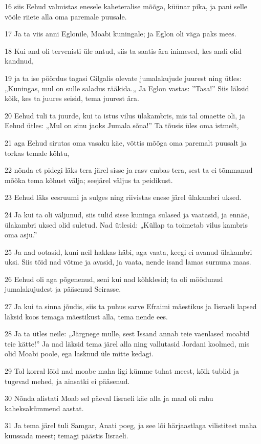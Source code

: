 \par 16 siis Eehud valmistas enesele kaheteralise mõõga, küünar pika, ja pani selle vööle riiete alla oma paremale puusale.
\par 17 Ja ta viis anni Eglonile, Moabi kuningale; ja Eglon oli väga paks mees.
\par 18 Kui and oli tervenisti üle antud, siis ta saatis ära inimesed, kes andi olid kandnud,
\par 19 ja ta ise pöördus tagasi Gilgalis olevate jumalakujude juurest ning ütles: „Kuningas, mul on sulle saladus rääkida.„ Ja Eglon vastas: ”Tasa!” Siis läksid kõik, kes ta juures seisid, tema juurest ära.
\par 20 Eehud tuli ta juurde, kui ta istus vilus ülakambris, mis tal omaette oli, ja Eehud ütles: „Mul on sinu jaoks Jumala sõna!” Ta tõusis üles oma istmelt,
\par 21 aga Eehud sirutas oma vasaku käe, võttis mõõga oma paremalt puusalt ja torkas temale kõhtu,
\par 22 nõnda et pidegi läks tera järel sisse ja rasv embas tera, sest ta ei tõmmanud mõõka tema kõhust välja; seejärel väljus ta peidikust.
\par 23 Eehud läks eesruumi ja sulges ning riivistas enese järel ülakambri uksed.
\par 24 Ja kui ta oli väljunud, siis tulid sisse kuninga sulased ja vaatasid, ja ennäe, ülakambri uksed olid suletud. Nad ütlesid: „Küllap ta toimetab vilus kambris oma asju.”
\par 25 Ja nad ootasid, kuni neil hakkas häbi, aga vaata, keegi ei avanud ülakambri uksi. Siis tõid nad võtme ja avasid, ja vaata, nende isand lamas surnuna maas.
\par 26 Eehud oli aga põgenenud, seni kui nad kõhklesid; ta oli möödunud jumalakujudest ja pääsenud Seirasse.
\par 27 Ja kui ta sinna jõudis, siis ta puhus sarve Efraimi mäestikus ja Iisraeli lapsed läksid koos temaga mäestikust alla, tema nende ees.
\par 28 Ja ta ütles neile: „Järgnege mulle, sest Issand annab teie vaenlased moabid teie kätte!” Ja nad läksid tema järel alla ning vallutasid Jordani koolmed, mis olid Moabi poole, ega lasknud üle mitte kedagi.
\par 29 Tol korral lõid nad moabe maha ligi kümme tuhat meest, kõik tublid ja tugevad mehed, ja ainsatki ei pääsenud.
\par 30 Nõnda alistati Moab sel päeval Iisraeli käe alla ja maal oli rahu kaheksakümmend aastat.
\par 31 Ja tema järel tuli Samgar, Anati poeg, ja see lõi härjaastlaga vilistitest maha kuussada meest; temagi päästis Iisraeli.

